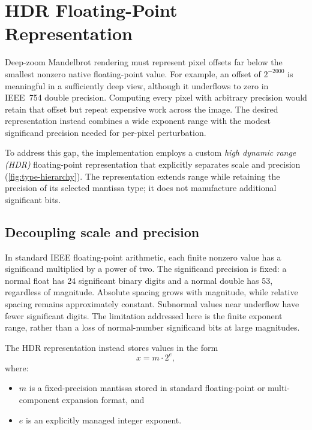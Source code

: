 \section{HDR Floating-Point Representation}
\label{sec:hdr-float}

Deep-zoom Mandelbrot rendering must represent pixel offsets far below the
smallest nonzero native floating-point value. For example, an offset of
$2^{-2000}$ is meaningful in a sufficiently deep view, although it underflows
to zero in IEEE~754 double precision. Computing every pixel with arbitrary
precision would retain that offset but repeat expensive work across the image.
The desired representation instead combines a wide exponent range with the
modest significand precision needed for per-pixel perturbation.

To address this gap, the implementation employs a custom \emph{high dynamic range (HDR)}
floating-point representation that explicitly separates scale and precision
(\cref{fig:type-hierarchy}).
The representation extends range while retaining the precision of its selected
mantissa type; it does not manufacture additional significant bits.

\subsection{Decoupling scale and precision}

In standard IEEE floating-point arithmetic, each finite nonzero value has a
significand multiplied by a power of two. The significand precision is fixed:
a normal float has 24 significant binary digits and a normal double has 53,
regardless of magnitude. Absolute spacing grows with magnitude, while relative
spacing remains approximately constant. Subnormal values near underflow have
fewer significant digits. The limitation addressed here is the finite exponent
range, rather than a loss of normal-number significand bits at large magnitudes.

The HDR representation instead stores values in the form
\begin{equation}
x = m \cdot 2^{e},
\end{equation}
where:
\begin{itemize}
\item \(m\) is a fixed-precision mantissa stored in standard floating-point or
      multi-component expansion format, and
\item \(e\) is an explicitly managed integer exponent.
\end{itemize}

